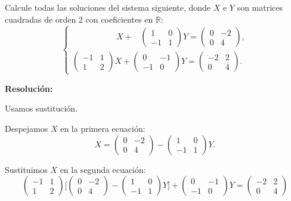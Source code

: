 \documentclass[a4paper,12pt]{article}
\begin{document}
\begin{ejercicio}[title=Ejercicio 24]
Calcule todas las soluciones del sistema siguiente, donde $X$ e $Y$ son matrices cuadradas de orden 2 con coeficientes en $\mathbb{R}$:
\[
\begin{cases}
\phantom{
\begin{pmatrix}
-1 & 1\\
1 & 2
\end{pmatrix}
}\,
X +
\,\,\,\,\,
\begin{pmatrix}
1 & 0\\
-1 & 1
\end{pmatrix}
Y =
\begin{pmatrix}
0 & -2\\
0 & 4
\end{pmatrix},\\[1em]
\begin{pmatrix}
-1 & 1\\
1 & 2
\end{pmatrix}
X +
\begin{pmatrix}
0 & -1\\
-1 & 0
\end{pmatrix}
Y =
\begin{pmatrix}
-2 & 2\\
0 & 4
\end{pmatrix}.
\end{cases}
\]

\tcblower
\textbf{Resolución:}

Usamos sustitución.

Despejamos \(X\) en la primera ecuación:
\[
X =
\begin{pmatrix}
0 & -2\\
0 & 4
\end{pmatrix}
-
\begin{pmatrix}
1 & 0\\
-1 & 1
\end{pmatrix} Y.
\]

Sustituimos \(X\) en la segunda ecuación:
\[
\begin{pmatrix}
-1 & 1\\
1 & 2
\end{pmatrix}
\Bigg[
\begin{pmatrix}
0 & -2\\
0 & 4
\end{pmatrix}
-
\begin{pmatrix}
1 & 0\\
-1 & 1
\end{pmatrix} Y
\Bigg]
+
\begin{pmatrix}
0 & -1\\
-1 & 0
\end{pmatrix} Y
=
\begin{pmatrix}
-2 & 2\\
0 & 4
\end{pmatrix}
\]


\end{ejercicio}
\end{document}
